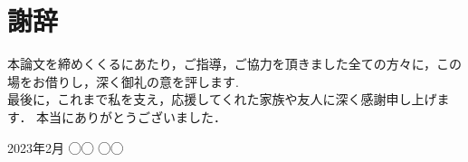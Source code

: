 \documentclass[../main]{subfiles}
\begin{document}
\chapter*{謝辞}
\label{thankyou}

\lhead[謝辞]{}
\thispagestyle{empty}

\newpage

本論文を締めくくるにあたり，ご指導，ご協力を頂きました全ての方々に，この場をお借りし，深く御礼の意を評します.
\\

最後に，これまで私を支え，応援してくれた家族や友人に深く感謝申し上げます．
本当にありがとうございました．

\begin{flushright}
    2023年2月 ◯◯ ◯◯
\end{flushright}
\end{document}
